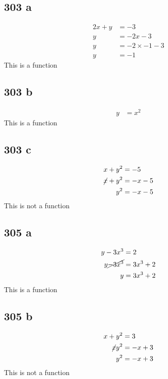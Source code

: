 \documentclass{article}
\begin{document}
    \subsection*{303 a}
    \begin{align*}
        2x + y &= -3\\
        y &= -2x -3\\
        y &= -2 \times -1 - 3 \\
        y &= -1
    \end{align*}
    \hspace{4cm}This is a function

    \subsection*{303 b}
    \begin{align*}
        y &= x^2
    \end{align*}
    \hspace{4cm}This is a function

    \subsection*{303 c}
    \begin{align*}
        x + y^2 &= -5\\
        \cancel{x} + y^2 &= -x -5\\
        y^2 &= -x - 5
    \end{align*}
    \hspace{4cm}This is not a function

    \subsection*{305 a}
    \begin{align*}
        y - 3x^3 &= 2\\
        y \cancel{- 3x^3} &= 3x^3 + 2\\
        y &= 3x^3 + 2
    \end{align*}
    \hspace{4cm}This is a function

    \subsection*{305 b}
    \begin{align*}
        x + y^2 &= 3\\
        \cancel{x} y^2 &= -x + 3\\
        y^2 &= -x + 3
    \end{align*}
    \hspace{4cm}This is not a function
\end{document}
